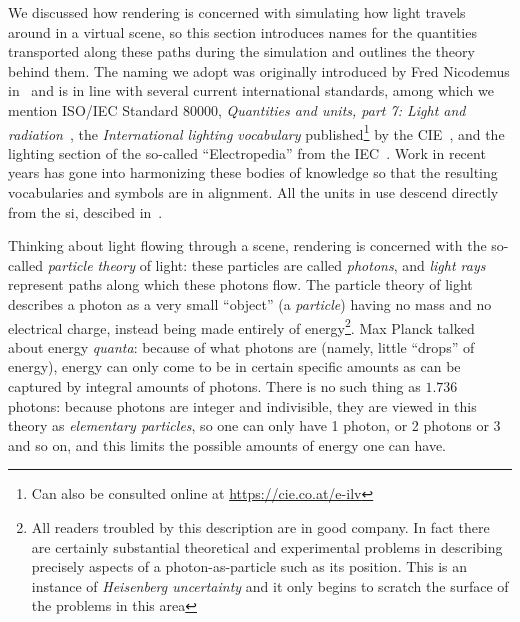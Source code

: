 \noindent We discussed how \gls{rendering} is concerned with simulating how light travels around in 
a \gls{virtual scene}, so this section introduces names for the quantities transported 
along these paths during the simulation and outlines the theory behind them. 
The naming we adopt was originally introduced by Fred Nicodemus in~\cite{nicodemus77} and
is in line with several current international standards,  
among which we mention \gls{ISO}/\gls{IEC} Standard 80000, 
\emph{Quantities and units, part 7: Light and radiation}~\cite{iso:80000-7:2019}, 
the \emph{International lighting vocabulary} published\footnote{Can also be consulted 
	online at \url{https://cie.co.at/e-ilv}} by the \gls{CIE}~\cite{cie:s017.2020},
and the lighting section of the so-called ``Electropedia'' from the \gls{IEC}~\cite{iec:60050-845:2020}.
Work in recent years has gone into harmonizing these bodies of knowledge so that the resulting 
vocabularies and symbols are in alignment. All the units in use descend directly
from the \gls{si}, descibed in~\cite{bipm:si.2019}.

Thinking about light flowing through a scene, rendering is concerned with the so-called
\textsl{particle theory} of light: these particles are called \textsl{photons}, 
and \textsl{light rays} represent paths along which these photons flow.
The particle theory of light describes a photon as a very small ``object'' 
(a \textsl{particle}) having no mass and no electrical charge, 
instead being made entirely of energy\footnote{
	All readers troubled by this description are in good company. In fact there are 
	certainly substantial theoretical and experimental problems in describing precisely
 	aspects of a photon-as-particle such as its position. 
 	This is an instance of \textsl{Heisenberg uncertainty}
 	and it only begins to scratch the surface of the problems in this area}. 
Max Planck talked about energy \textsl{quanta}: because of what photons are 
(namely, little ``drops'' of energy), 
energy can only come to be in certain specific amounts as can be captured by integral 
amounts of photons. There is no such thing as $1.736$ photons: because photons are integer and 
indivisible, they are viewed in this theory as \textsl{elementary particles}, 
so one can only have 1 photon, or 2 photons or 3 and so on, and this limits the possible
amounts of energy one can have.

